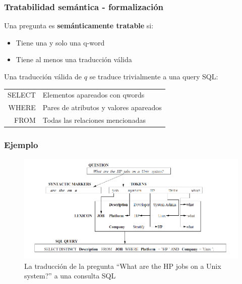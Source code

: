 \fontsize{10pt}{11.2}\selectfont
\begin{frame}[<+->]
\frametitle{Tratabilidad semántica - formalización}
Una pregunta es \textbf{semánticamente tratable} si:
\begin{itemize}
  \item Tiene una y solo una q-word 
  \item Tiene al menos una traducción válida
\end{itemize}

\bigskip
\bigskip

Una traducción válida de $q$ se traduce trivialmente a una query SQL:
\bigskip
\centering
\begin{tabular}{ r | l }
SELECT &  Elementos apareados con qwords \\
WHERE & Pares de atributos y valores apareados\\
FROM & Todas las relaciones mencionadas \\
\end{tabular}
\end{frame}

\fontsize{11pt}{7.2}\selectfont
\begin{frame}
\frametitle{Ejemplo}
\begin{figure}
  \centering
    \includegraphics[scale=.7]{graficos/popescu-example}
  \caption{La traducción de la pregunta ``What are the HP jobs on a Unix system?'' a una consulta SQL}
  \label{fig:popescu-example}
\end{figure}
\end{frame}


